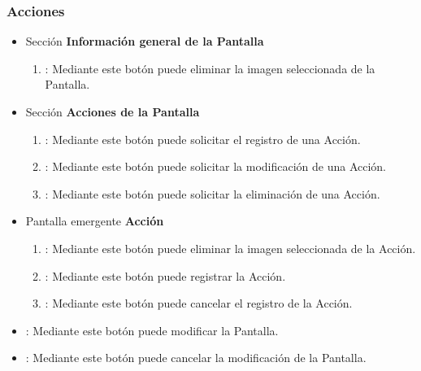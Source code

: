 \subsubsection{Acciones}
\begin{itemize}
 \item Sección \textbf{Información general de la Pantalla}
  \begin{enumerate}
	\item \btnEliminar[Eliminar]: Mediante este botón puede eliminar la imagen seleccionada de la Pantalla.
  \end{enumerate}
  \item Sección \textbf{Acciones de la Pantalla}
  \begin{enumerate}
	\item {}: Mediante este botón puede solicitar el registro de una Acción.
	\item {}: Mediante este botón puede solicitar la modificación de una Acción.
	\item {}: Mediante este botón puede solicitar la eliminación de una Acción.
  \end{enumerate}
  \item Pantalla emergente \textbf{Acción}
  \begin{enumerate}
	\item \btnEliminar[Eliminar]: Mediante este botón puede eliminar la imagen seleccionada de la Acción.
	\item {}: Mediante este botón puede registrar la Acción.
	\item {}: Mediante este botón puede cancelar el registro de la Acción.
  \end{enumerate}
 \item {}: Mediante este botón puede modificar la Pantalla.
 \item {}: Mediante este botón puede cancelar la modificación de la Pantalla.
\end{itemize}
	
	
